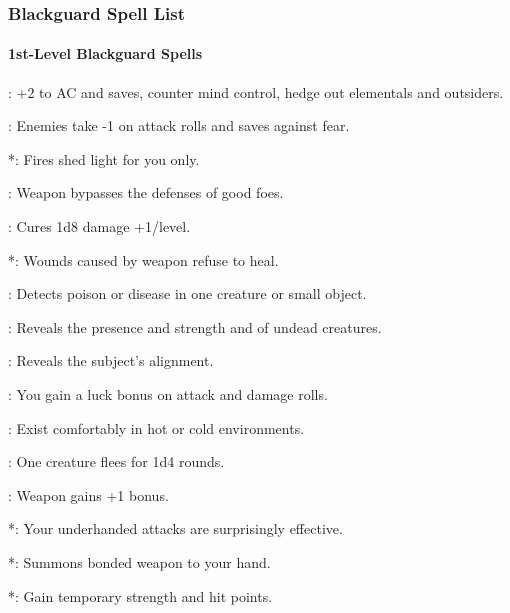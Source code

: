 \subsubsection{Blackguard Spell List}
\label{sec:BlackguardSpellList}
\paragraph{1st-Level Blackguard Spells}
\begin{list}{}{\leftmargin=1em}
\item {}: +2 to AC and saves, counter mind control, hedge out elementals and outsiders.
\item {}: Enemies take -1 on attack rolls and saves against fear.%
\item {}*: Fires shed light for you only. %
\item {}: Weapon bypasses the defenses of good foes. %
\item {}: Cures 1d8 damage +1/level.
\item {}*: Wounds caused by weapon refuse to heal. %
\item {}: Detects poison or disease in one creature or small object.
\item {}: Reveals the presence and strength and of undead creatures.
\item {}: Reveals the subject's alignment.
\item {}: You gain a luck bonus on attack and damage rolls.
\item {}: Exist comfortably in hot or cold environments.
\item {}: One creature flees for 1d4 rounds. %
\item {}: Weapon gains +1 bonus.
\item {}*: Your underhanded attacks are surprisingly effective. %
\item {}*: Summons bonded weapon to your hand.
\item {}*: Gain temporary strength and hit points.
\end{list}
